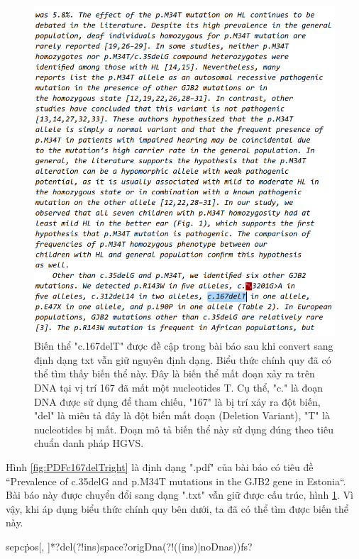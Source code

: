 \documentclass[../DoAn.tex]{subfiles}
\begin{document}
\begin{figure}
\centering
\includegraphics[width=1\linewidth]{Hinh_ve/TXTc167delTright.png}
\caption{Biến thể "c.167delT" được đề cập trong bài báo sau khi convert sang định dạng txt vẫn giữ nguyên định dạng. Biểu thức chính quy đã có thể tìm thấy biến thể này. Đây là biến thể mất đoạn xảy ra trên DNA tại vị trí 167 đã mất một nucleotides T. Cụ thể, "c." là đoạn DNA được sử dụng để tham chiếu, "167" là bị trí xảy ra đột biến, "del" là miêu tả đây là đột biến mất đoạn (Deletion Variant), "T" là nucleotides bị mất. Đoạn mô tả biến thể này sử dụng đúng theo tiêu chuẩn danh pháp HGVS.}
\label{fig:TXTc167delTright}
\end{figure}

Hình \ref{fig:PDFc167delTright} là định dạng ".pdf" của bài báo có tiêu đề ``Prevalence of c.35delG and p.M34T mutations in the GJB2 gene in Estonia``. Bài báo này được chuyển đổi sang dạng ".txt" vẫn giữ được cấu trúc, hình \ref{fig:TXTc167delTright}. Vì vậy, khi áp dụng biểu thức chính quy bên dưới, ta đã có thể tìm được biến thể này. 
\begin{center}{sep}c\.{pos}[, ]*?del(?!ins){space}?{origDna}(?!((ins)|{noDnas})){fs}?\end{center}
\end{document}
